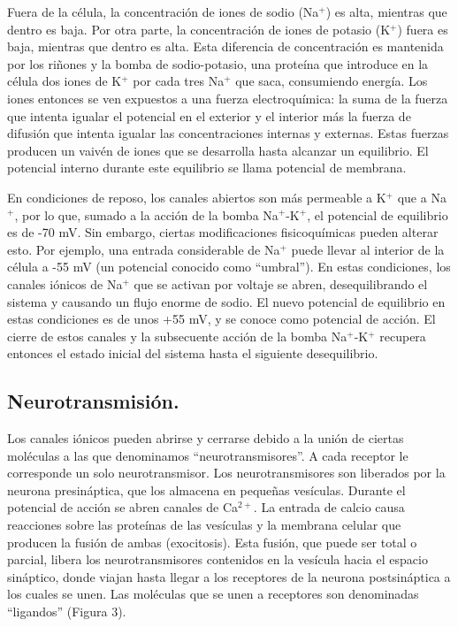 Fuera de la célula, la concentración de iones de sodio (Na$^+$) es alta, mientras que dentro es baja. Por otra parte, la concentración de iones de potasio (K$^+$) fuera es baja, mientras que dentro es alta. Esta diferencia de concentración es mantenida por los riñones y la bomba de sodio-potasio, una proteína que introduce en la célula dos iones de K$^+$ por cada tres Na$^+$ que saca, consumiendo energía. Los iones entonces se ven expuestos a una fuerza electroquímica: la suma de la fuerza que intenta igualar el potencial en el exterior y el interior más la fuerza de difusión que intenta igualar las concentraciones internas y externas. Estas fuerzas producen un vaivén de iones que se desarrolla hasta alcanzar un equilibrio. El potencial interno durante este equilibrio se llama potencial de membrana.

En condiciones de reposo, los canales abiertos son más permeable a K$^+$ que a Na$^+$, por lo que, sumado a la acción de la bomba Na$^+$-K$^+$, el potencial de equilibrio es de -70 mV. Sin embargo, ciertas modificaciones fisicoquímicas pueden alterar esto. Por ejemplo, una entrada considerable de Na$^+$ puede llevar al interior de la célula a -55 mV (un potencial conocido como \enquote{umbral}). En estas condiciones, los canales iónicos de Na$^+$ que se activan por voltaje se abren, desequilibrando el sistema y causando un flujo enorme de sodio. El nuevo potencial de equilibrio en estas condiciones es de unos +55 mV, y se conoce como potencial de acción. El cierre de estos canales y la subsecuente acción de la bomba Na$^+$-K$^+$ recupera entonces el estado inicial del sistema hasta el siguiente desequilibrio.


\subsection{Neurotransmisión.}

Los canales iónicos pueden abrirse y cerrarse debido a la unión de ciertas moléculas a las que denominamos \enquote{neurotransmisores}. A cada receptor le corresponde un solo neurotransmisor. Los neurotransmisores son liberados por la neurona presináptica, que los almacena en pequeñas vesículas. Durante el potencial de acción se abren canales de Ca$^{2+}$. La entrada de calcio causa reacciones sobre las proteínas de las vesículas y la membrana celular que producen la fusión de ambas (exocitosis). Esta fusión, que puede ser total o parcial, libera los neurotransmisores contenidos en la vesícula hacia el espacio sináptico, donde viajan hasta llegar a los receptores de la neurona postsináptica a los cuales se unen. Las moléculas que se unen a receptores son denominadas \enquote{ligandos} (Figura 3).

